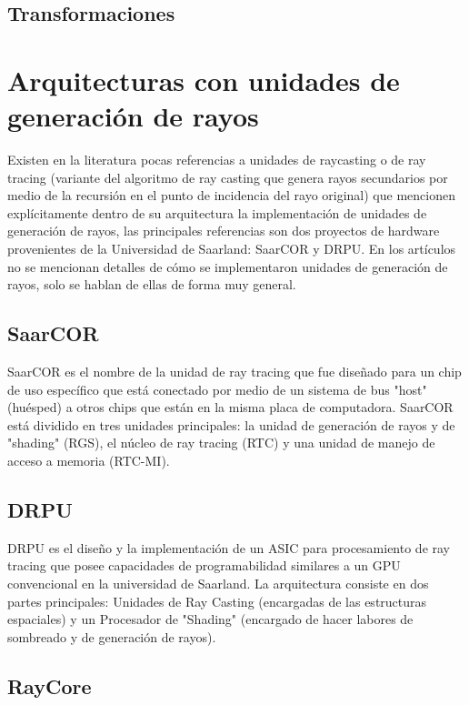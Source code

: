 \subsection{Transformaciones}

\section{Arquitecturas con unidades de generación de rayos}

Existen en la literatura pocas referencias a unidades de raycasting o de ray tracing (variante del algoritmo de ray casting que genera rayos secundarios por medio de la recursión en el punto de incidencia del rayo original) que mencionen explícitamente dentro de su arquitectura la implementación de unidades de generación de rayos, las principales referencias son dos proyectos de hardware provenientes de la Universidad de Saarland: SaarCOR y DRPU. En los artículos no se mencionan detalles de cómo se implementaron unidades de generación de rayos, solo se hablan de ellas de forma muy general.

\subsection{SaarCOR}

SaarCOR es el nombre de la unidad de ray tracing que fue diseñado para un chip de uso específico que está conectado por medio de un sistema de bus "host" (huésped) a otros chips que están en la misma placa de computadora. SaarCOR está dividido en tres unidades principales: la unidad de generación de rayos y de "shading" (RGS), el núcleo de ray tracing (RTC) y una unidad de manejo de acceso a memoria (RTC-MI).   

\subsection{DRPU}

DRPU es el diseño y la implementación de un ASIC para procesamiento de ray tracing que posee capacidades de programabilidad similares a un GPU convencional en la universidad de Saarland. La arquitectura consiste en dos partes principales: Unidades de Ray Casting (encargadas de las estructuras espaciales) y un Procesador de "Shading" (encargado de hacer labores de sombreado y de generación de rayos).  

\subsection{RayCore}

